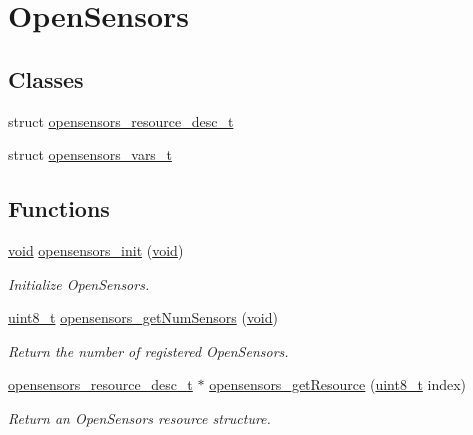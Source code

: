 \hypertarget{group___open_sensors}{}\section{Open\+Sensors}
\label{group___open_sensors}
\subsection*{Classes}
\begin{DoxyCompactItemize}
\item 
struct \hyperlink{structopensensors__resource__desc__t}{opensensors\+\_\+resource\+\_\+desc\+\_\+t}
\item 
struct \hyperlink{structopensensors__vars__t}{opensensors\+\_\+vars\+\_\+t}
\end{DoxyCompactItemize}
\subsection*{Functions}
\begin{DoxyCompactItemize}
\item 
\hyperlink{usb__devapi_8h_afabf60e7f57651d6d595a02c75f07cd0}{void} \hyperlink{group___open_sensors_ga848dedd92abfd550d8f60e6f6a68c21d}{opensensors\+\_\+init} (\hyperlink{usb__devapi_8h_afabf60e7f57651d6d595a02c75f07cd0}{void})
\begin{DoxyCompactList}\small\item\em Initialize Open\+Sensors. \end{DoxyCompactList}\item 
\hyperlink{_p_e___types_8h_aba7bc1797add20fe3efdf37ced1182c5}{uint8\+\_\+t} \hyperlink{group___open_sensors_ga947d231e649df6aa9232d33263285baf}{opensensors\+\_\+get\+Num\+Sensors} (\hyperlink{usb__devapi_8h_afabf60e7f57651d6d595a02c75f07cd0}{void})
\begin{DoxyCompactList}\small\item\em Return the number of registered Open\+Sensors. \end{DoxyCompactList}\item 
\hyperlink{structopensensors__resource__desc__t}{opensensors\+\_\+resource\+\_\+desc\+\_\+t} $\ast$ \hyperlink{group___open_sensors_gaddc09ea50aeff0c230ba37ec1963265d}{opensensors\+\_\+get\+Resource} (\hyperlink{_p_e___types_8h_aba7bc1797add20fe3efdf37ced1182c5}{uint8\+\_\+t} index)
\begin{DoxyCompactList}\small\item\em Return an Open\+Sensors resource structure. \end{DoxyCompactList}\end{DoxyCompactItemize}
